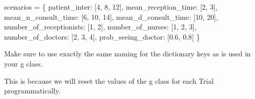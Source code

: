 \documentclass[
  letterpaper,
  DIV=11,
  numbers=noendperiod]{scrreprt}
\newenvironment{Shaded}{}{}
\newcommand{\DecValTok}[1]{\textcolor[rgb]{0.00,0.36,0.77}{#1}}
\newcommand{\FloatTok}[1]{\textcolor[rgb]{0.00,0.36,0.77}{#1}}
\newcommand{\NormalTok}[1]{\textcolor[rgb]{0.14,0.16,0.18}{#1}}
\newcommand{\OperatorTok}[1]{\textcolor[rgb]{0.14,0.16,0.18}{#1}}
\newcommand{\StringTok}[1]{\textcolor[rgb]{0.01,0.18,0.38}{#1}}
\begin{document}
\begin{Shaded}
\begin{Highlighting}[]
\NormalTok{scenarios }\OperatorTok{=}\NormalTok{ \{}
    \StringTok{\textquotesingle{}patient\_inter\textquotesingle{}}\NormalTok{: [}\DecValTok{4}\NormalTok{, }\DecValTok{8}\NormalTok{, }\DecValTok{12}\NormalTok{],}
    \StringTok{\textquotesingle{}mean\_reception\_time\textquotesingle{}}\NormalTok{: [}\DecValTok{2}\NormalTok{, }\DecValTok{3}\NormalTok{],}
    \StringTok{\textquotesingle{}mean\_n\_consult\_time\textquotesingle{}}\NormalTok{: [}\DecValTok{6}\NormalTok{, }\DecValTok{10}\NormalTok{, }\DecValTok{14}\NormalTok{],}
    \StringTok{\textquotesingle{}mean\_d\_consult\_time\textquotesingle{}}\NormalTok{: [}\DecValTok{10}\NormalTok{, }\DecValTok{20}\NormalTok{],}
    \StringTok{\textquotesingle{}number\_of\_receptionists\textquotesingle{}}\NormalTok{: [}\DecValTok{1}\NormalTok{, }\DecValTok{2}\NormalTok{],}
    \StringTok{\textquotesingle{}number\_of\_nurses\textquotesingle{}}\NormalTok{: [}\DecValTok{1}\NormalTok{, }\DecValTok{2}\NormalTok{, }\DecValTok{3}\NormalTok{],}
    \StringTok{\textquotesingle{}number\_of\_doctors\textquotesingle{}}\NormalTok{: [}\DecValTok{2}\NormalTok{, }\DecValTok{3}\NormalTok{, }\DecValTok{4}\NormalTok{],}
    \StringTok{\textquotesingle{}prob\_seeing\_doctor\textquotesingle{}}\NormalTok{: [}\FloatTok{0.6}\NormalTok{, }\FloatTok{0.8}\NormalTok{]}
\NormalTok{\}}
\end{Highlighting}
\end{Shaded}

\begin{tcolorbox}[enhanced jigsaw, colframe=quarto-callout-tip-color-frame, bottomtitle=1mm, breakable, rightrule=.15mm, coltitle=black, colbacktitle=quarto-callout-tip-color!10!white, opacityback=0, leftrule=.75mm, arc=.35mm, toptitle=1mm, title=\textcolor{quarto-callout-tip-color}{\faLightbulb}\hspace{0.5em}{Tip}, titlerule=0mm, colback=white, toprule=.15mm, bottomrule=.15mm, left=2mm, opacitybacktitle=0.6]

Make sure to use exactly the same naming for the dictionary keys as is
used in your g class.

This is because we will reset the values of the g class for each Trial
programmatically.

\end{tcolorbox}
\end{document}
